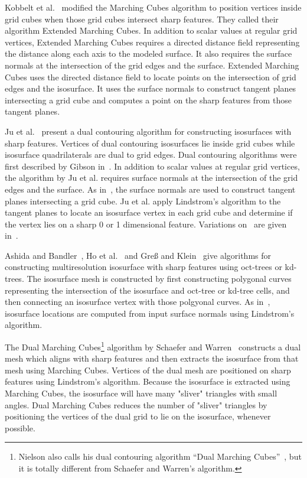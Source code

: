 Kobbelt et al.~\cite{kbsh-fssev-01} modified the Marching Cubes algorithm
to position vertices inside grid cubes when those grid cubes
intersect sharp features.
They called their algorithm Extended Marching Cubes.
In addition to scalar values at regular grid vertices,
Extended Marching Cubes requires a directed distance field
representing the distance along each axis to the modeled surface.
It also requires the surface normals
at the intersection of the grid edges and the surface.
Extended Marching Cubes uses the directed distance field
to locate points on the intersection of grid edges and the isosurface.
It uses the surface normals to construct tangent planes
intersecting a grid cube and computes a point on the sharp features
from those tangent planes.

Ju et al.~\cite{jlsw-dchd-02,sw-dcss-02} present a dual contouring algorithm
for constructing isosurfaces with sharp features.
Vertices of dual contouring isosurfaces lie inside grid cubes
while isosurface quadrilaterals are dual to grid edges.
Dual contouring algorithms were first described
by Gibson in~\cite{gh-ssqem-97,g-cesng-98}.
In addition to scalar values at regular grid vertices,
the algorithm by Ju et al. requires surface normals
at the intersection of the grid edges and the surface.
As in~\cite{kbsh-fssev-01},
the surface normals are used to construct tangent planes
intersecting a grid cube.
Ju et al. apply Lindstrom's algorithm to the tangent planes
to locate an isosurface vertex in each grid cube
and determine if the vertex lies on a sharp 0 or 1 dimensional feature.
Variations on~\cite{jlsw-dchd-02} are given 
in~\cite{zhk-dctps-04,Varadhan:2003:fss}.

Ashida and Bandler~\cite{ab-fpmmo-03}, Ho et al.~\cite{hwco-cmsaf-05}
and Gre{\ss} and Klein~\cite{gk-eretm-04} give algorithms
for constructing multiresolution isosurface with sharp features
using oct-trees or kd-trees.
The isosurface mesh is constructed
by first constructing polygonal curves representing the intersection
of the isosurface and oct-tree or kd-tree cells,
and then connecting an isosurface vertex with those polgyonal curves.
As in~\cite{jlsw-dchd-02},
isosurface locations are computed from input surface normals
using Lindstrom's algorithm.

The Dual Marching Cubes\footnote{Nielson also calls his
dual contouring algorithm ``Dual Marching Cubes''~\cite{n-dmc-04},
but it is totally different from Schaefer and Warren's algorithm.}
algorithm by Schaefer and Warren~\cite{sw-dmcpc-04}
constructs a dual mesh which aligns with sharp features
and then extracts the isosurface from that mesh 
using Marching Cubes.
Vertices of the dual mesh are positioned on sharp features
using Lindstrom's algorithm.
Because the isosurface is extracted using Marching Cubes,
the isosurface will have many "sliver" triangles with small angles.
Dual Marching Cubes reduces the number of "sliver" triangles
by positioning the vertices of the dual grid to lie on the isosurface,
whenever possible.


